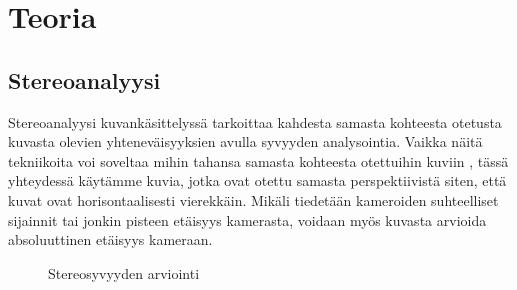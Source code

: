 \chapter{Teoria}%
\label{ch:teoria}

\section{Stereoanalyysi}

Stereoanalyysi kuvankäsittelyssä tarkoittaa kahdesta samasta kohteesta otetusta kuvasta olevien yhteneväisyyksien avulla syvyyden analysointia.  
Vaikka näitä tekniikoita voi soveltaa mihin tahansa samasta kohteesta otettuihin kuviin \cite{SumiYasushi20023ORi}, 
tässä yhteydessä käytämme kuvia, jotka ovat otettu samasta perspektiivistä siten, että kuvat ovat horisontaalisesti vierekkäin. 
Mikäli tiedetään kameroiden suhteelliset sijainnit tai jonkin pisteen etäisyys kamerasta, voidaan myös kuvasta arvioida absoluuttinen etäisyys kameraan. 

\begin{figure}[h]
\centering
{}
\caption{Stereosyvyyden arviointi}
\label{fig:stereo}
\end{figure}
    
